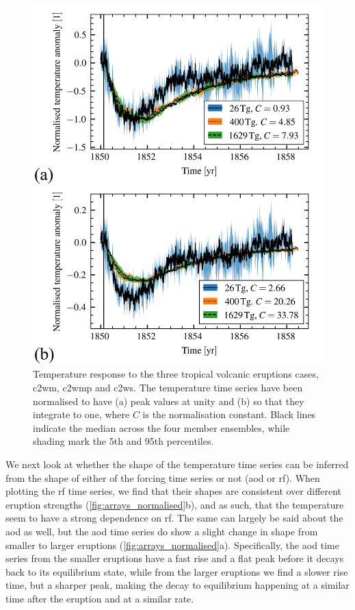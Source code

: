 \documentclass[twocol]{ametsocV6.1}
\begin{document}
\begin{figure}
  \centering
  \includegraphics[width=0.95\linewidth]{figures/compare-waveform.png}

  \caption{Temperature response to the three tropical volcanic eruptions cases,
    \gls{c2wm}, \gls{c2wmp} and \gls{c2ws}. The temperature time series have been normalised
    to have (a) peak values at unity and
    (b) so that they integrate to one, where \(C\) is the
    normalisation constant. Black lines indicate the median across the four member
    ensembles, while shading mark the 5th and 95th percentiles.}\label{fig:compare-waveform}%
\end{figure}

We next look at whether the shape of the temperature time series can be inferred from
the shape of either of the forcing time series or not (\gls{aod} or \gls{rf}). When
plotting the \gls{rf} time series, we find that their shapes are consistent over
different eruption strengths (\ref{fig:arrays_normalised}b), and as such, that the
temperature seem to have a strong dependence on \gls{rf}. The same can largely be said
about the \gls{aod} as well, but the \gls{aod} time series do show a slight change in
shape from smaller to larger eruptions (\ref{fig:arrays_normalised}a). Specifically,
the \gls{aod} time series from the smaller eruptions have a fast rise and a flat peak
before it decays back to its equilibrium state, while from the larger eruptions we find
a slower rise time, but a sharper peak, making the decay to equilibrium happening at a
similar time after the eruption and at a similar rate.
\end{document}

